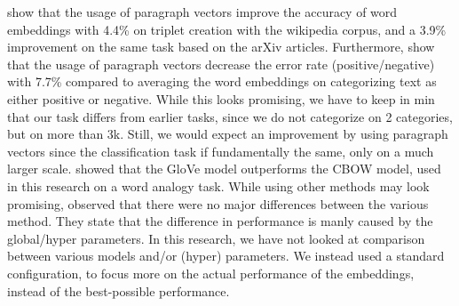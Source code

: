 \documentclass[../../Thesis.tex]{subfiles}
\begin{document}
\citet{dai2015document} show that the usage of paragraph vectors improve the accuracy of word embeddings with 4.4\% on triplet creation with the wikipedia corpus, and a 3.9\% improvement on the same task based on the arXiv articles. Furthermore, \citet{le2014distributed} show that the usage of paragraph vectors decrease the error rate (positive/negative) with 7.7\% compared to averaging the word embeddings on categorizing text as either positive or negative. While this looks promising, we have to keep in min that our task differs from earlier tasks, since we do not categorize on 2 categories, but on more than 3k. Still, we would expect an improvement by using paragraph vectors since the classification task if fundamentally the same, only on a much larger scale. \citet{pennington2014glove} showed that the GloVe model  outperforms the CBOW model, used in this research on a word analogy task. While using other methods may look promising, \citet{levy2015improving} observed that there were no major differences between the various method. They state that the difference in performance is manly caused by the global/hyper parameters. In this research,  we have not looked at comparison between various models and/or (hyper) parameters. We instead used a standard configuration, to focus more on the actual performance of the embeddings, instead of the best-possible performance.
\end{document}

